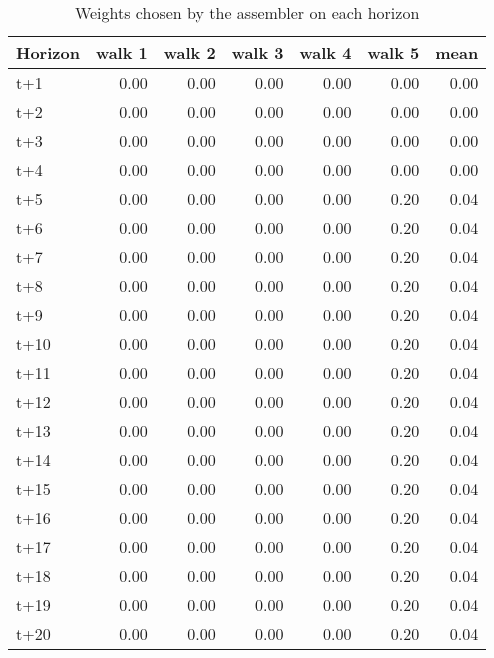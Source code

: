 \begin{table}[H]
\centering
\caption{Weights chosen by the assembler on each horizon}
\label{tab:weights_assembler}
\begin{tabular}{lrrrrrr}
\toprule
Horizon &  walk 1 &  walk 2 &  walk 3 &  walk 4 &  walk 5 &  mean \\
\midrule
t+1  &    0.00 &    0.00 &    0.00 &    0.00 &    0.00 &  0.00 \\
t+2  &    0.00 &    0.00 &    0.00 &    0.00 &    0.00 &  0.00 \\
t+3  &    0.00 &    0.00 &    0.00 &    0.00 &    0.00 &  0.00 \\
t+4  &    0.00 &    0.00 &    0.00 &    0.00 &    0.00 &  0.00 \\
t+5  &    0.00 &    0.00 &    0.00 &    0.00 &    0.20 &  0.04 \\
t+6  &    0.00 &    0.00 &    0.00 &    0.00 &    0.20 &  0.04 \\
t+7  &    0.00 &    0.00 &    0.00 &    0.00 &    0.20 &  0.04 \\
t+8  &    0.00 &    0.00 &    0.00 &    0.00 &    0.20 &  0.04 \\
t+9  &    0.00 &    0.00 &    0.00 &    0.00 &    0.20 &  0.04 \\
t+10 &    0.00 &    0.00 &    0.00 &    0.00 &    0.20 &  0.04 \\
t+11 &    0.00 &    0.00 &    0.00 &    0.00 &    0.20 &  0.04 \\
t+12 &    0.00 &    0.00 &    0.00 &    0.00 &    0.20 &  0.04 \\
t+13 &    0.00 &    0.00 &    0.00 &    0.00 &    0.20 &  0.04 \\
t+14 &    0.00 &    0.00 &    0.00 &    0.00 &    0.20 &  0.04 \\
t+15 &    0.00 &    0.00 &    0.00 &    0.00 &    0.20 &  0.04 \\
t+16 &    0.00 &    0.00 &    0.00 &    0.00 &    0.20 &  0.04 \\
t+17 &    0.00 &    0.00 &    0.00 &    0.00 &    0.20 &  0.04 \\
t+18 &    0.00 &    0.00 &    0.00 &    0.00 &    0.20 &  0.04 \\
t+19 &    0.00 &    0.00 &    0.00 &    0.00 &    0.20 &  0.04 \\
t+20 &    0.00 &    0.00 &    0.00 &    0.00 &    0.20 &  0.04 \\
\bottomrule
\end{tabular}
\end{table}
